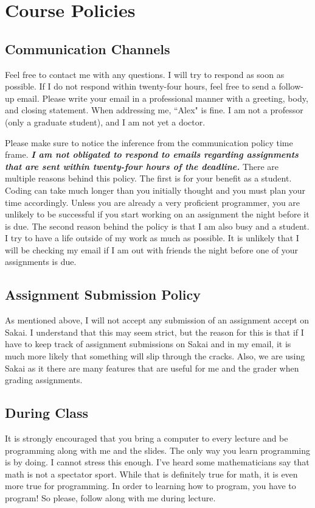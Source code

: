 \documentclass[11pt]{article}
\begin{document}
\section*{Course Policies}\label{sec:Policies}

\subsection*{Communication Channels}
Feel free to contact me with any questions. I will try to respond as soon as possible. If I do not respond within twenty-four hours, feel free to send a follow-up email. Please write your email in a professional manner with a greeting, body, and closing statement. When addressing me, ``Alex" is fine. I am not a professor (only a graduate student), and I am not yet a doctor. 

Please make sure to notice the inference from the communication policy time frame. \textit{\textbf{I am not obligated to respond to emails regarding assignments that are sent within twenty-four hours of the deadline.}} There are multiple reasons behind this policy. The first is for your benefit as a student. Coding can take much longer than you initially thought and you must plan your time accordingly. Unless you are already a very proficient programmer, you are unlikely to be successful if you start working on an assignment the night before it is due. The second reason behind the policy is that I am also busy and a student. I try to have a life outside of my work as much as possible. It is unlikely that I will be checking my email if I am out with friends the night before one of your assignments is due. 

\subsection*{Assignment Submission Policy}

As mentioned above, I will not accept any submission of an assignment accept on Sakai. I understand that this may seem strict, but the reason for this is that if I have to keep track of assignment submissions on Sakai and in my email, it is much more likely that something will slip through the cracks. Also, we are using Sakai as it there are many features that are useful for me and the grader when grading assignments. 

\subsection*{During Class}
It is strongly encouraged that you bring a computer to every lecture and be programming along with me and the slides. The only way you learn programming is by doing. I cannot stress this enough. I've heard some mathematicians say that math is not a spectator sport. While that is definitely true for math, it is even more true for programming. In order to learning how to program, you have to program! So please, follow along with me during lecture. 
\end{document}
